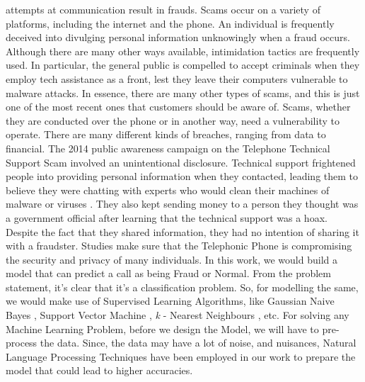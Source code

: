 \documentclass[sn-basic]{sn-jnl}%
\theoremstyle{thmstyleone}%
\theoremstyle{thmstyletwo}%
\theoremstyle{thmstylethree}%
\begin{document}
attempts at communication result in frauds. Scams occur on a variety of platforms, including the internet and the phone. An individual is frequently deceived into divulging personal information unknowingly when a fraud occurs. Although there are many other ways available, intimidation tactics are frequently used. In particular, the general public is compelled to accept criminals when they employ tech assistance as a front, lest they leave their computers vulnerable to malware attacks. In essence, there are many other types of scams, and this is just one of the most recent ones that customers should be aware of. Scams, whether they are conducted over the phone or in another way, need a vulnerability to operate. There are many different kinds of breaches, ranging from data to financial. The 2014 public awareness campaign on the Telephone Technical Support Scam involved an unintentional disclosure. Technical support frightened people into providing personal information when they contacted, leading them to believe they were chatting with experts who would clean their machines of malware \cite{rafiq2022andromalpack} or viruses \cite{lwoff1967principles}. They also kept sending money to a person they thought was a government official after learning that the technical support was a hoax. Despite the fact that they shared information, they had no intention of sharing it with a fraudster. Studies make sure that the Telephonic Phone is compromising the security and privacy of many individuals. In this work, we would build a model that can predict a call as being Fraud or Normal. From the problem statement, it's clear that it's a classification problem. So, for modelling the same, we would make use of Supervised Learning Algorithms, like Gaussian Naive Bayes \cite{pan2022application}, Support Vector Machine \cite{he2022evaluation}, \textit{k} - Nearest Neighbours \cite{uddin2022comparative}, etc. For solving any Machine Learning Problem, before we design the Model, we will have to pre-process the data. Since, the data may have a lot of noise, and nuisances, Natural Language Processing \cite{russo2022explaining} Techniques have been employed in our work to prepare the model that could lead to higher accuracies. 
\end{document}
